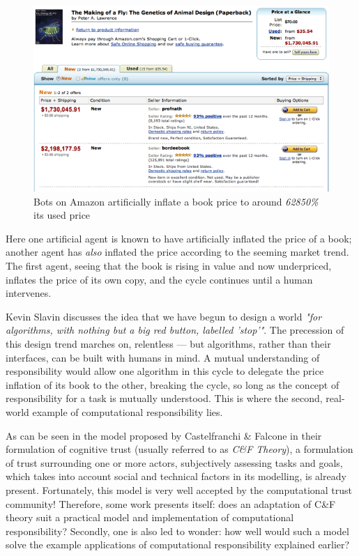 \documentclass{mprop}
\begin{document}
\begin{figure}[ht]
\centering
\includegraphics[trim=0.7cm 0.7cm 0.7cm 0.7cm, scale=0.75]{images/amazon_price_hike_fly_genetics}
\caption{Bots on Amazon artificially inflate a book price to around \emph{62850\%} its used price}
\end{figure}

Here one artificial agent is known to have artificially inflated the price of a book; another agent has \emph{also} inflated the price according to the seeming market trend. The first agent, seeing that the book is rising in value and now underpriced, inflates the price of its own copy, and the cycle continues until a human intervenes. \par

Kevin Slavin discusses the idea that we have begun to design a world \emph{"for algorithms\cite{SlavinHOWWORLD}, with nothing but a big red button, labelled 'stop'"}. The precession of this design trend marches on, relentless --- but algorithms, rather than their interfaces, can be built with humans in mind. A mutual understanding of responsibility would allow one algorithm in this cycle to delegate the price inflation of its book to the other, breaking the cycle, so long as the concept of responsibility for a task is mutually understood. This is where the second, real-world example of computational responsibility lies. \par

As can be seen in the model proposed by Castelfranchi \& Falcone in their formulation of cognitive trust\cite{CastelfranchiSocialApproach} (usually referred to as \emph{C\&F Theory}), a formulation of trust surrounding one or more actors, subjectively assessing tasks and goals, which takes into account social and technical factors in its modelling, is already present. Fortunately, this model is very well accepted by the computational trust community! Therefore, some work presents itself: does an adaptation of C\&F theory suit a practical model and implementation of computational responsibility? Secondly, one is also led to wonder: how well would such a model solve the example applications of computational responsibility explained earlier?
\end{document}
